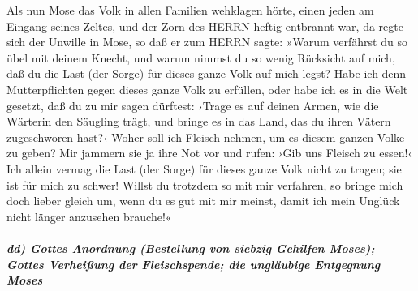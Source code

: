 Als nun Mose das Volk in allen Familien wehklagen hörte,
einen jeden am Eingang seines Zeltes, und der Zorn des HERRN heftig
entbrannt war, da regte sich der Unwille in Mose, so daß
er zum HERRN sagte: »Warum verfährst du so übel mit deinem Knecht, und
warum nimmst du so wenig Rücksicht auf mich, daß du die Last (der Sorge)
für dieses ganze Volk auf mich legst? Habe ich denn
Mutterpflichten gegen dieses ganze Volk zu erfüllen, oder habe ich es in
die Welt gesetzt, daß du zu mir sagen dürftest: ›Trage es auf deinen
Armen, wie die Wärterin den Säugling trägt, und bringe es in das Land,
das du ihren Vätern zugeschworen hast?‹ Woher soll ich
Fleisch nehmen, um es diesem ganzen Volke zu geben? Mir jammern sie ja
ihre Not vor und rufen: ›Gib uns Fleisch zu essen!‹ Ich
allein vermag die Last (der Sorge) für dieses ganze Volk nicht zu
tragen; sie ist für mich zu schwer! Willst du trotzdem so
mit mir verfahren, so bringe mich doch lieber gleich um, wenn du es gut
mit mir meinst, damit ich mein Unglück nicht länger anzusehen brauche!«

\hypertarget{dd-gottes-anordnung-bestellung-von-siebzig-gehilfen-moses-gottes-verheiuxdfung-der-fleischspende-die-ungluxe4ubige-entgegnung-moses}{%
\subparagraph{dd) Gottes Anordnung (Bestellung von siebzig Gehilfen
Moses); Gottes Verheißung der Fleischspende; die ungläubige Entgegnung
Moses}\label{dd-gottes-anordnung-bestellung-von-siebzig-gehilfen-moses-gottes-verheiuxdfung-der-fleischspende-die-ungluxe4ubige-entgegnung-moses}}

